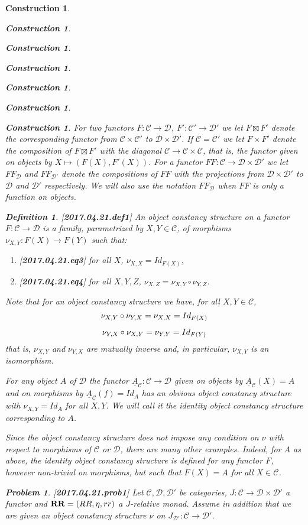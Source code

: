 \documentclass[12pt]{amsart}
\newtheorem{definition}[proposition]{Definition}
\newtheorem{problem}[proposition]{Problem}
\newtheorem{construction}[proposition]{Construction}
\newcommand{\llabel}[1]{\label{#1}[{\bf #1}]}
\newcommand{\sr}{\rightarrow}
\newcommand{\uu}{\underline}
\newcommand{\RR}{{\bf RR}}
\newcommand{\C}{{\mathcal C}}
\newcommand{\D}{{\mathcal D}}
\begin{document}
\begin{construction}
\begin{construction}
\begin{construction}
\begin{construction}
\begin{construction}
\begin{construction}
\begin{construction}
For two functors $F:\C\sr\D$, $F':\C'\sr\D'$ we let $F\boxtimes F'$ denote the corresponding functor from $\C\times\C'$ to $\D\times\D'$. If $\C=\C'$ we let $F\times F'$ denote the composition of $F\boxtimes F'$ with the diagonal $\C\sr \C\times\C$, that is, the functor given on objects by $X\mapsto (F(X),F'(X))$. For a functor $FF:\C\sr \D\times\D'$ we let $FF_{\D}$ and $FF_{\D'}$ denote the compositions of $FF$ with the projections from $\D\times\D'$ to $\D$ and $\D'$ respectively. We will also use the notation $FF_{\D}$ when $FF$ is only a function on objects. 
%
\begin{definition}
\llabel{2017.04.21.def1}
An object constancy structure on a functor $F:\C\sr\D$ is a family, parametrized by $X,Y\in\C$, of morphisms $\nu_{X,Y}:F(X)\sr F(Y)$ such that:
%
\begin{enumerate}
\item \llabel{2017.04.21.eq3} for all $X$, $\nu_{X,X}=Id_{F(X)}$,
\item \llabel{2017.04.21.eq4} for all $X,Y,Z$, $\nu_{X,Z}=\nu_{X,Y}\circ\nu_{Y,Z}$.
\end{enumerate}
\end{definition}
%
Note that for an object constancy structure we have, for all $X,Y\in \C$, 
%
$$
\begin{CD}
\nu_{X,Y}\circ \nu_{Y,X}=\nu_{X,X}=Id_{F(X)}\\
\nu_{Y,X}\circ \nu_{X,Y}=\nu_{Y,Y}=Id_{F(Y)}
\end{CD}
$$
%
that is, $\nu_{X,Y}$ and $\nu_{Y,X}$ are mutually inverse and, in particular, $\nu_{X,Y}$ is an isomorphism. 

For any object $A$ of $\D$ the functor $\uu{A}_{\C}:\C\sr \D$ given on objects by $\uu{A}_{\C}(X)=A$ and on morphisms by $\uu{A}_{\C}(f)=Id_A$ has an obvious object constancy structure with $\nu_{X,Y}=Id_A$ for all $X,Y$. We will call it the identity object constancy structure corresponding to $A$.

Since the object constancy structure does not impose any condition on $\nu$ with respect to morphisms of $\C$ or $\D$, there are many other examples. Indeed, for $A$ as above, the identity object constancy structure is defined for any functor $F$, however non-trivial on morphisms, but such that $F(X)=A$ for all $X\in\C$.  
%
\begin{problem}
\llabel{2017.04.21.prob1}
Let $\C,\D,\D'$ be categories, $J:\C\sr \D\times\D'$ a functor and $\RR=(RR,\eta,rr)$ a $J$-relative monad. Assume in addition that we are given an object constancy structure $\nu$ on $J_{\D'}:\C\sr\D'$.


\end{problem}
\end{construction}
\end{construction}
\end{construction}
\end{construction}
\end{construction}
\end{construction}
\end{construction}
\end{document}
